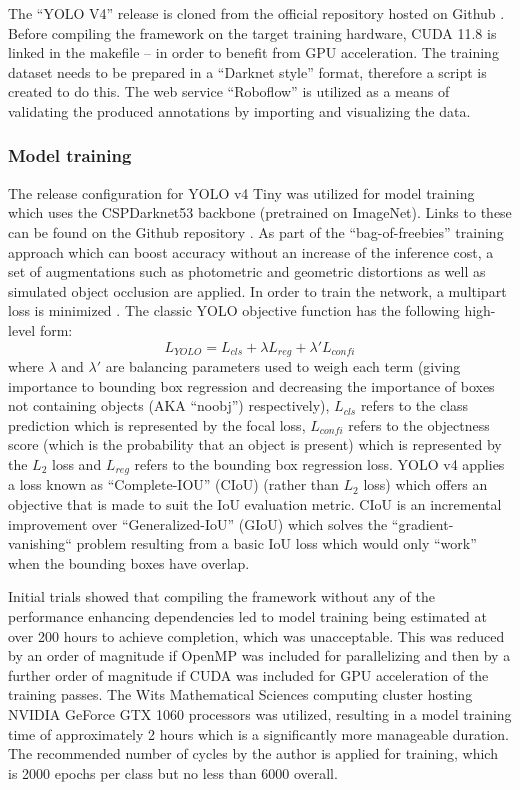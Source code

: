 \documentclass[a4paper,twoside,12pt]{report}
\begin{document}
 The ``YOLO V4'' release is cloned from the official repository hosted on Github \citep{yolov4repo}. Before compiling the framework on the target training hardware, CUDA 11.8 is linked in the makefile -- in order to benefit from GPU acceleration. The training dataset needs to be prepared in a ``Darknet style'' format, therefore a script is created to do this. The web service ``Roboflow'' \citep{roboflow} is utilized as a means of validating the produced annotations by importing and visualizing the data. 

\subsubsection{Model training}

The release configuration for YOLO v4 Tiny was utilized for model training which uses the CSPDarknet53 backbone (pretrained on ImageNet). Links to these can be found on the Github repository \citep{yolov4repo}. As part of the ``bag-of-freebies'' training approach which can boost accuracy without an increase of the inference cost, a set of augmentations such as photometric and geometric distortions as well as simulated object occlusion are applied. In order to train the network, a multipart loss is minimized \citep{yolov4}. The classic YOLO objective function has the following high-level form:
\begin{equation}
L_{YOLO} =  L_{cls} + \lambda L_{reg} + \lambda' L_{confi} 
\end{equation} 
where $\lambda$ and $\lambda'$ are balancing parameters used to weigh each term (giving importance to bounding box regression and decreasing the importance of boxes not containing objects (AKA ``noobj'') respectively), $L_{cls} $ refers to the class prediction which is represented by the focal loss, $L_{confi}$ refers to the objectness score (which is the probability that an object is present) which is represented by the $L_2$ loss and $L_{reg} $ refers to the bounding box regression loss. YOLO v4 applies a loss known as ``Complete-IOU'' (CIoU) \citep{diouloss} (rather than $L_2$ loss) which offers an objective that is made to suit the IoU evaluation metric. CIoU is an incremental improvement over ``Generalized-IoU'' (GIoU) \citep{giouloss} which solves the ``gradient-vanishing`` problem resulting from a basic IoU loss which would only ``work'' when the bounding boxes have overlap. 

Initial trials showed that compiling the framework without any of the performance enhancing dependencies led to model training being estimated at over 200 hours to achieve completion, which was unacceptable. This was reduced by an order of magnitude if OpenMP was included for parallelizing and then by a further order of magnitude if CUDA was included for GPU acceleration of the training passes. The Wits Mathematical Sciences computing cluster hosting NVIDIA GeForce GTX 1060 processors was utilized, resulting in a model training time of approximately 2 hours which is a significantly more manageable duration. The recommended number of cycles by the author is applied for training, which is 2000 epochs per class but no less than 6000 overall.
\end{document}

